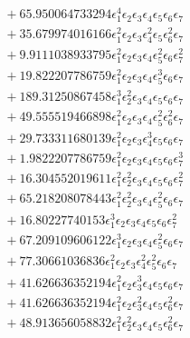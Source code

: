 \documentclass[10pt]{article}
\begin{document}
\begin{align*}
&{}  + 65.950064733294 \epsilon_{1}^{4} \epsilon_{2} \epsilon_{3} \epsilon_{4} \epsilon_{5} \epsilon_{6} \epsilon_{7} \\
&{}  + 35.679974016166 \epsilon_{1}^{2} \epsilon_{2} \epsilon_{3} \epsilon_{4}^{2} \epsilon_{5} \epsilon_{6}^{2} \epsilon_{7} \\
&{}  + 9.9111038933795 \epsilon_{1}^{2} \epsilon_{2} \epsilon_{3} \epsilon_{4} \epsilon_{5}^{2} \epsilon_{6} \epsilon_{7}^{2} \\
&{}  + 19.822207786759 \epsilon_{1}^{2} \epsilon_{2} \epsilon_{3} \epsilon_{4} \epsilon_{5}^{3} \epsilon_{6} \epsilon_{7} \\
&{}  + 189.31250867458 \epsilon_{1}^{3} \epsilon_{2}^{2} \epsilon_{3} \epsilon_{4} \epsilon_{5} \epsilon_{6} \epsilon_{7} \\
&{}  + 49.555519466898 \epsilon_{1}^{2} \epsilon_{2} \epsilon_{3} \epsilon_{4} \epsilon_{5}^{2} \epsilon_{6}^{2} \epsilon_{7} \\
&{}  + 29.733311680139 \epsilon_{1}^{2} \epsilon_{2} \epsilon_{3} \epsilon_{4}^{3} \epsilon_{5} \epsilon_{6} \epsilon_{7} \\
&{}  + 1.9822207786759 \epsilon_{1}^{2} \epsilon_{2} \epsilon_{3} \epsilon_{4} \epsilon_{5} \epsilon_{6} \epsilon_{7}^{3} \\
&{}  + 16.304552019611 \epsilon_{1}^{2} \epsilon_{2}^{2} \epsilon_{3} \epsilon_{4} \epsilon_{5} \epsilon_{6} \epsilon_{7}^{2} \\
&{}  + 65.218208078443 \epsilon_{1}^{2} \epsilon_{2}^{2} \epsilon_{3} \epsilon_{4} \epsilon_{5}^{2} \epsilon_{6} \epsilon_{7} \\
&{}  + 16.80227740153 \epsilon_{1}^{3} \epsilon_{2} \epsilon_{3} \epsilon_{4} \epsilon_{5} \epsilon_{6} \epsilon_{7}^{2} \\
&{}  + 67.209109606122 \epsilon_{1}^{3} \epsilon_{2} \epsilon_{3} \epsilon_{4} \epsilon_{5}^{2} \epsilon_{6} \epsilon_{7} \\
&{}  + 77.30661036836 \epsilon_{1}^{2} \epsilon_{2} \epsilon_{3} \epsilon_{4}^{2} \epsilon_{5}^{2} \epsilon_{6} \epsilon_{7} \\
&{}  + 41.626636352194 \epsilon_{1}^{2} \epsilon_{2} \epsilon_{3}^{3} \epsilon_{4} \epsilon_{5} \epsilon_{6} \epsilon_{7} \\
&{}  + 41.626636352194 \epsilon_{1}^{2} \epsilon_{2} \epsilon_{3}^{2} \epsilon_{4} \epsilon_{5} \epsilon_{6}^{2} \epsilon_{7} \\
&{}  + 48.913656058832 \epsilon_{1}^{2} \epsilon_{2}^{2} \epsilon_{3} \epsilon_{4} \epsilon_{5} \epsilon_{6}^{2} \epsilon_{7} \\

\end{align*}
\end{document}
